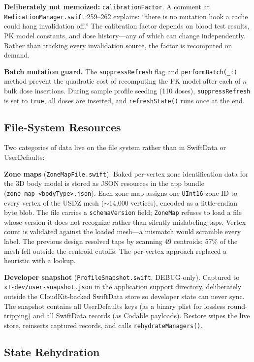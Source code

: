 \documentclass[11pt,a4paper]{article}
\newcommand{\code}[1]{\texttt{\small #1}}
\begin{document}
\textbf{Deliberately not memoized:} \code{calibrationFactor}. A comment at
\code{MedicationManager.swift}:259--262 explains: ``there is no mutation
hook a cache could hang invalidation off.'' The calibration factor depends on
blood test results, PK model constants, and dose history---any of which can
change independently. Rather than tracking every invalidation source, the
factor is recomputed on demand.

\textbf{Batch mutation guard.} The \code{suppressRefresh} flag and
\code{performBatch(\_:)} method prevent the quadratic cost of recomputing the
PK model after each of $n$ bulk dose insertions. During sample profile
seeding (110 doses), \code{suppressRefresh} is set to \code{true},
all doses are inserted, and \code{refreshState()} runs once at the end.

\subsection{File-System Resources}
\label{sec:file_system}

Two categories of data live on the file system rather than in SwiftData or
UserDefaults:

\textbf{Zone maps} (\code{ZoneMapFile.swift}). Baked per-vertex zone
identification data for the 3D body model is stored as JSON resources in the
app bundle (\verb|zone_map_<bodyType>.json|). Each zone map assigns one
\code{UInt16} zone ID to every vertex of the USDZ mesh ($\sim$14,000
vertices), encoded as a little-endian byte blob. The file carries a
\code{schemaVersion} field; \code{ZoneMap} refuses to load a file whose
version it does not recognize rather than silently mislabeling taps. Vertex
count is validated against the loaded mesh---a mismatch would scramble every
label. The previous design resolved taps by scanning 49 centroids; 57\% of
the mesh fell outside the centroid cutoffs. The per-vertex approach replaced
a heuristic with a lookup.

\textbf{Developer snapshot} (\code{ProfileSnapshot.swift}, DEBUG-only).
Captured to \verb|xT-dev/user-snapshot.json| in the application support
directory, deliberately outside the CloudKit-backed SwiftData store so
developer state can never sync. The snapshot contains all UserDefaults keys
(as a binary plist for lossless round-tripping) and all SwiftData records
(as Codable payloads). Restore wipes the live store, reinserts captured
records, and calls \code{rehydrateManagers()}.

\subsection{State Rehydration}
\label{sec:rehydration}
\end{document}
